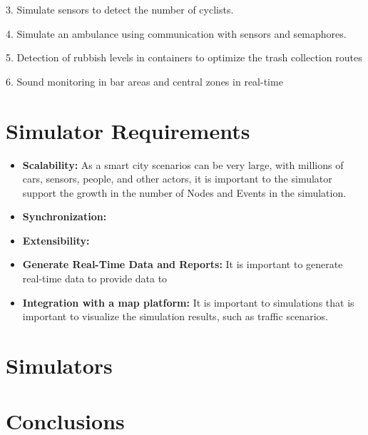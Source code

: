 \documentclass[
journal=jacsat, %
manuscript=article]{achemso}
\begin{document}
3. Simulate sensors to detect the number of cyclists.

4. Simulate an ambulance using communication with sensors and semaphores.

5. Detection of rubbish levels in containers to optimize the trash collection routes

6. Sound monitoring in bar areas and central zones in real-time

\section{Simulator Requirements}
\begin{itemize}

\item \textbf{Scalability:} As a smart city scenarios can be very large, with millions of cars, sensors, people, and other actors, it is important to the simulator support the growth in the number of Nodes and Events in the simulation. 
\item \textbf{Synchronization:} 
\item \textbf{Extensibility:}
\item \textbf{Generate Real-Time Data and Reports:} It is important to generate real-time data to provide data to 
\item \textbf{Integration with a map platform:} It is important to simulations that is important to visualize the simulation results, such as traffic scenarios.

\end{itemize}

\section{Simulators}

\section{Conclusions}


\end{document}
